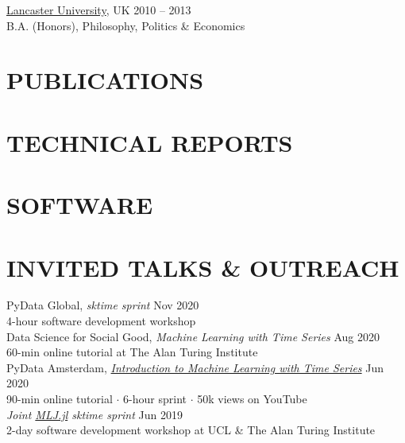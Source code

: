 \documentclass{cv}
\newcommand{\printbibsection}[2]{
\begin{refsection}
\nocite{*}
\printbibliography[sorting=chronological,
                  type={#1},
                  title={#2},
                  heading=none]
\end{refsection}
}
\begin{document}
\href{https://www.lancs.ac.uk/}{Lancaster University}, UK \hfill 2010 -- 2013 \\
B.A. (Honors), Philosophy, Politics \& Economics

\section{PUBLICATIONS}
\printbibsection{article}{}

\section{TECHNICAL REPORTS}
\printbibsection{proceedings}{}

\section{SOFTWARE}
\printbibsection{misc}{}

\section{INVITED TALKS \& OUTREACH}

PyData Global, \textit{sktime sprint} \hfill Nov 2020 \\
{\color{lightgray} 4-hour software development workshop} \\

Data Science for Social Good, \textit{Machine Learning with Time Series} \hfill Aug 2020 \\
{\color{lightgray} 60-min online tutorial at The Alan Turing Institute} \\

PyData Amsterdam, \href{https://www.youtube.com/watch?v=wqQKFu41FIw}{\textit{Introduction to Machine Learning with Time Series}} \hfill Jun 2020 \\
{\color{lightgray} 90-min online tutorial $\cdot$ 6-hour sprint $\cdot$ 50k views on YouTube} \\

\textit{Joint \href{https://github.com/alan-turing-institute/MLJ.jl}{MLJ.jl} sktime sprint} \hfill Jun 2019 \\
{\color{lightgray} 2-day software development workshop at UCL \& The Alan Turing Institute} \\
\end{document}
